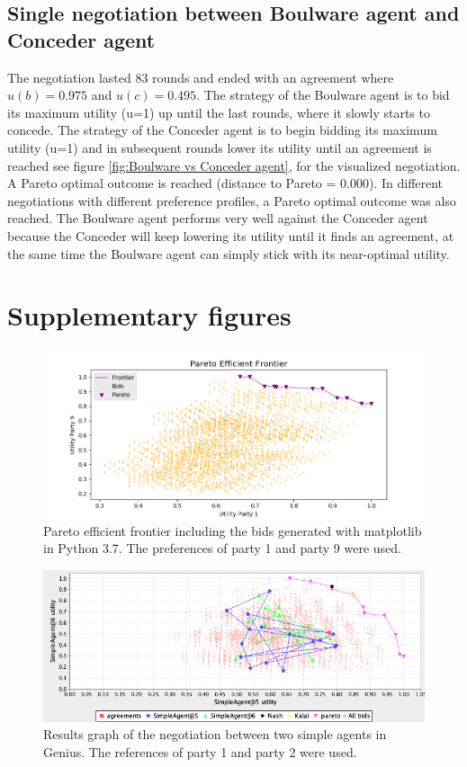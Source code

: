 \documentclass[a4paper]{article}
\begin{document}
\subsection{Single negotiation between Boulware agent and Conceder agent}
The negotiation lasted 83 rounds and ended with an agreement where $u(b) = 0.975$ and $u(c) = 0.495$. The strategy of the Boulware agent is to bid its maximum utility (u=1) up until the last rounds, where it slowly starts to concede. The strategy of the Conceder agent is to begin bidding its maximum utility (u=1) and in subsequent rounds lower its utility until an agreement is reached see figure \ref{fig:Boulware vs Conceder agent}, for the visualized negotiation. A Pareto optimal outcome is reached (distance to Pareto = 0.000). In different negotiations with different preference profiles, a Pareto optimal outcome was also reached. The Boulware agent performs very well against the Conceder agent because the Conceder will keep lowering its utility until it finds an agreement, at the same time the Boulware agent can simply stick with its near-optimal utility. 

\newpage
\section{\vspace{-1em}Supplementary figures}
\begin{figure}[h!]
\centering
\includegraphics[width=125mm]{pareto_efficient.png}
\caption{Pareto efficient frontier including the bids generated with matplotlib in Python 3.7. The preferences of party 1 and party 9 were used.}
\label{fig:Pareto efficient figure}
\end{figure}

\begin{figure}[h!]
\centering
\includegraphics[width=125mm]{simplevssimple.png}
\caption{Results graph of the negotiation between two simple agents in Genius. The references of party 1 and party 2 were used.}
\label{fig:Simple vs simple agents}
\end{figure}
\end{document}
